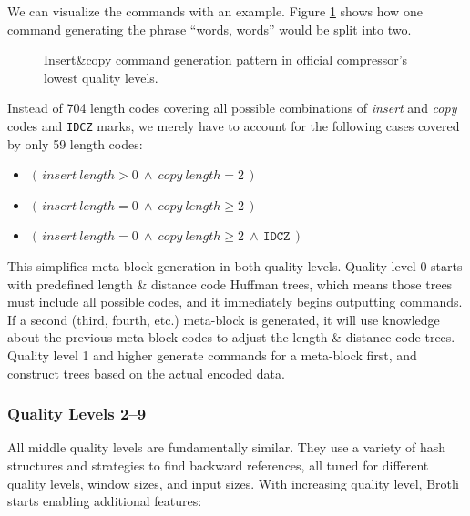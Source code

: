 \documentclass[english,master,dept460,male,cpp,cpdeclaration]{diploma}
\newcommand{\nosep}{\itemsep0em}
\newcommand{\texfigure}[1]{
}
\begin{document}
		We can visualize the commands with an example. Figure \ref{fig:quality-0-1-command-generation-example} shows how one command generating the phrase \enquote{words, words} would be split into two.
		
		\begin{figure}[H]
			\medskip
			\texfigure{quality-0-1-command-generation-example}
			\caption{Insert\&copy command generation pattern in official compressor's lowest quality levels.}
			\label{fig:quality-0-1-command-generation-example}
		\end{figure}
		
		\noindent
		Instead of 704 length codes covering all possible combinations of \emph{insert} and \emph{copy} codes and \verb|IDCZ| marks, we merely have to account for the following cases covered by only 59 length codes:
		
		\begin{itemize} \nosep
			\item $(\,insert\ length > 0\ \wedge\ copy\ length = 2\,)$
			\item $(\,insert\ length = 0\ \wedge\ copy\ length \geq 2\,)$
			\item $(\,insert\ length = 0\ \wedge\ copy\ length \geq 2\ \wedge\,\mathtt{IDCZ}\,)$
		\end{itemize}
		
		\noindent
		This simplifies meta-block generation in both quality levels. Quality level 0 starts with predefined length \& distance code Huffman trees, which means those trees must include all possible codes, and it immediately begins outputting commands. If a second (third, fourth, etc.) meta-block is generated, it will use knowledge about the previous meta-block codes to adjust the length \& distance code trees. Quality level 1 and higher generate commands for a meta-block first, and construct trees based on the actual encoded data.
		
		\subsubsection{Quality Levels 2--9}
		
		All middle quality levels are fundamentally similar. They use a variety of hash structures and strategies to find backward references, all tuned for different quality levels, window sizes, and input sizes. With increasing quality level, Brotli starts enabling additional features:
		
\end{document}
